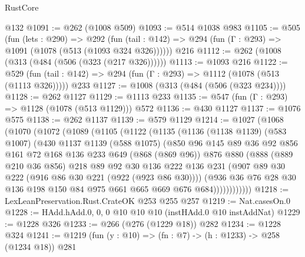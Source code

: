\begin{lexlean}{RustCore}
\begin{coremodule}
    @132
@1091 := @262 (@1008 @509)
@1093 := @514 @1038 @983
@1105 := @505
    (fun (lets : @290) =>
    @292 (fun (tail : @142) => @294 (fun (Γ : @293) => @1091 (@1078 (@513 (@1093 @324 @326))))))
    @216
@1112 := @262 (@1008 (@313 (@484 (@506 (@323 (@217 @326))))))
@1113 := @1093 @216
@1122 := @529 (fun (tail : @142) => @294 (fun (Γ : @293) => @1112 (@1078 (@513 (@1113 @326))))) @233
@1127 := @1008 (@313 (@484 (@506 (@323 @234))))
@1128 := @262 @1127
@1129 := @1113 @233
@1135 := @547 (fun (Γ : @293) => @1128 (@1078 (@513 @1129))) @572
@1136 := @430 @1127
@1137 := @1076 @575
@1138 := @262 @1137
@1139 := @579 @1129
@1214 := @1027
    (@1068
      (@1070
        (@1072
          (@1089
            (@1105
              (@1122
                (@1135
                  (@1136
                    (@1138 @1139)
                    (@583 @1007)
                    (@430
                      @1137
                      @1139
                      (@588 @1075)
                      (@850
                        @96
                        @145
                        @89
                        @36
                        @92
                        @856
                        @161
                        @72
                        @168
                        @136
                        @233
                        @649
                        (@868 (@869 @96))
                        @876
                        @880
                        (@888
                          (@889 @210 @36 @856)
                          @218
                          @89
                          @92
                          @30
                          @136
                          @222
                          @136
                          @231
                          (@907 @89 @30 @222 (@916 @86 @30 @221 (@922 (@923 @86 @30))))
                          (@936
                            @36
                            @76
                            @28
                            @30
                            @136
                            @198
                            @150
                            @84
                            @975
                            @661
                            @665
                            @669
                            @676
                            @684))))))))))))
@1218 := LexLeanPreservation.Rust.CrateOK @253 @255 @257
@1219 := Nat.casesOn.{0}
@1228 := HAdd.hAdd.{0, 0, 0} @10 @10 @10 (instHAdd.{0} @10 instAddNat)
@1229 := @1228 @326
@1233 := @266 (@276 (@1229 @18)) @282
@1234 := @1228 @324
@1241 := @1219 (fun (y : @10) => (fn : @7) -> (h : @1233) -> @258 (@1234 @18)) @281

\end{coremodule}
\end{lexlean}
